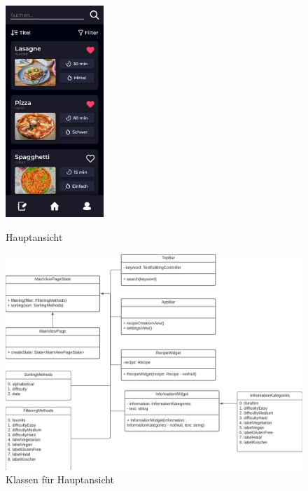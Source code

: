 \documentclass[parskip=full]{scrartcl}
\begin{document}
    \begin{figure}[htp]
    \begin{minipage}
        [t]{0.49\textwidth}
        \centering
        \includegraphics[height=80mm]{images/Presentation-layer/MainView.jpg}
        \caption{Hauptansicht}
        \end{minipage}
    \begin{minipage}
        [t]{0.49\textwidth}
        \centering
        \includegraphics[height=0.95\textwidth]{images/Presentation-layer/MainViewClass.png}
        \caption{Klassen für Hauptansicht}
    \end{minipage}
\end{figure}
\end{document}
